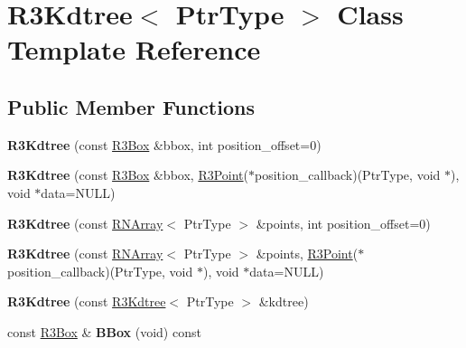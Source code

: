 \hypertarget{class_r3_kdtree}{}\section{R3\+Kdtree$<$ Ptr\+Type $>$ Class Template Reference}
\label{class_r3_kdtree}
\subsection*{Public Member Functions}
\begin{DoxyCompactItemize}
\item 
{\bfseries R3\+Kdtree} (const \hyperlink{class_r3_box}{R3\+Box} \&bbox, int position\+\_\+offset=0)\hypertarget{class_r3_kdtree_a689526419ffbce0bc405963ed0be2997}{}\label{class_r3_kdtree_a689526419ffbce0bc405963ed0be2997}

\item 
{\bfseries R3\+Kdtree} (const \hyperlink{class_r3_box}{R3\+Box} \&bbox, \hyperlink{class_r3_point}{R3\+Point}($\ast$position\+\_\+callback)(Ptr\+Type, void $\ast$), void $\ast$data=N\+U\+LL)\hypertarget{class_r3_kdtree_a8aa6010354ce64df48829eb35c35bb92}{}\label{class_r3_kdtree_a8aa6010354ce64df48829eb35c35bb92}

\item 
{\bfseries R3\+Kdtree} (const \hyperlink{class_r_n_array}{R\+N\+Array}$<$ Ptr\+Type $>$ \&points, int position\+\_\+offset=0)\hypertarget{class_r3_kdtree_a31fcf0a9e20cf63d491ddf4447860bce}{}\label{class_r3_kdtree_a31fcf0a9e20cf63d491ddf4447860bce}

\item 
{\bfseries R3\+Kdtree} (const \hyperlink{class_r_n_array}{R\+N\+Array}$<$ Ptr\+Type $>$ \&points, \hyperlink{class_r3_point}{R3\+Point}($\ast$position\+\_\+callback)(Ptr\+Type, void $\ast$), void $\ast$data=N\+U\+LL)\hypertarget{class_r3_kdtree_ab8940db6cca4aee9cc26d9e4ffce7e17}{}\label{class_r3_kdtree_ab8940db6cca4aee9cc26d9e4ffce7e17}

\item 
{\bfseries R3\+Kdtree} (const \hyperlink{class_r3_kdtree}{R3\+Kdtree}$<$ Ptr\+Type $>$ \&kdtree)\hypertarget{class_r3_kdtree_a7ae51ebc9ea7a2ffd88c5275bf4aadbf}{}\label{class_r3_kdtree_a7ae51ebc9ea7a2ffd88c5275bf4aadbf}

\item 
const \hyperlink{class_r3_box}{R3\+Box} \& {\bfseries B\+Box} (void) const \hypertarget{class_r3_kdtree_a41e526ac31c29835b8b7c4a4dd13dcfe}{}\label{class_r3_kdtree_a41e526ac31c29835b8b7c4a4dd13dcfe}


\end{DoxyCompactItemize}
